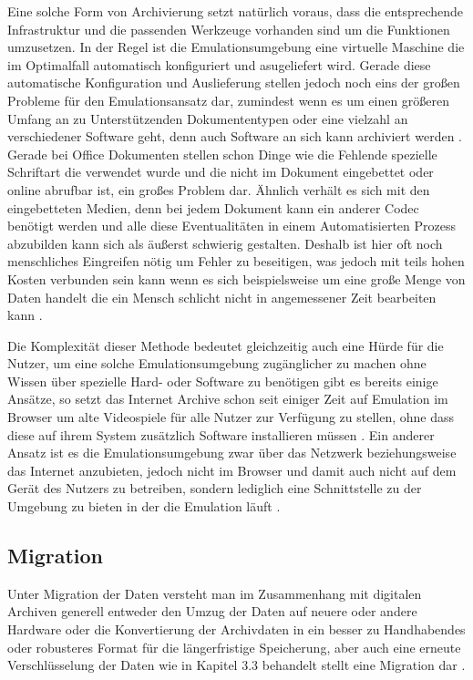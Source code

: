 \documentclass[conference,compsoc,final,a4paper]{IEEEtran}
\begin{document}
Eine solche Form von Archivierung setzt natürlich voraus, dass die entsprechende Infrastruktur und die passenden Werkzeuge vorhanden sind um die Funktionen umzusetzen. In der Regel ist die Emulationsumgebung eine virtuelle Maschine die im Optimalfall automatisch konfiguriert und asugeliefert wird. Gerade diese automatische Konfiguration und Auslieferung stellen jedoch noch eins der großen Probleme für den Emulationsansatz dar, zumindest wenn es um einen größeren  Umfang an zu Unterstützenden Dokumententypen oder eine vielzahl an verschiedener Software geht, denn auch Software an sich kann archiviert werden \autocite{Reichherzer2006}. Gerade bei Office Dokumenten stellen schon Dinge wie die Fehlende spezielle Schriftart die verwendet wurde und die nicht im Dokument eingebettet oder online abrufbar ist, ein großes Problem dar. Ähnlich verhält es sich mit den eingebetteten Medien, denn bei jedem Dokument kann ein anderer Codec benötigt werden und alle diese Eventualitäten in einem Automatisierten Prozess abzubilden kann sich als äußerst schwierig gestalten. Deshalb ist hier oft noch menschliches Eingreifen nötig um Fehler zu beseitigen, was jedoch mit teils hohen Kosten verbunden sein kann wenn es sich beispielsweise um eine große Menge von Daten handelt die ein Mensch schlicht nicht in angemessener Zeit bearbeiten kann \autocite{Reichherzer2006}.

Die Komplexität dieser Methode bedeutet gleichzeitig auch eine Hürde für die Nutzer, um eine solche Emulationsumgebung zugänglicher zu machen ohne Wissen über spezielle Hard- oder Software zu benötigen gibt es bereits einige Ansätze, so setzt das Internet Archive schon seit einiger Zeit auf Emulation im Browser um alte Videospiele für alle Nutzer zur Verfügung zu stellen, ohne dass diese auf ihrem System zusätzlich Software installieren müssen \autocite{IAEmulator}. Ein anderer Ansatz ist es die Emulationsumgebung zwar über das Netzwerk beziehungsweise das Internet anzubieten, jedoch nicht im Browser und damit auch nicht auf dem Gerät des Nutzers zu betreiben, sondern lediglich eine Schnittstelle zu der Umgebung zu bieten in der die Emulation läuft \autocite{Rechert2010}.

\subsection{Migration}
Unter Migration der Daten versteht man im Zusammenhang mit digitalen Archiven generell entweder den Umzug der Daten auf neuere oder andere Hardware oder die Konvertierung der Archivdaten in ein besser zu Handhabendes oder robusteres Format für die längerfristige Speicherung, aber auch eine erneute Verschlüsselung der Daten wie in Kapitel 3.3 behandelt stellt eine Migration dar \autocite{Factor2009}.
\end{document}
